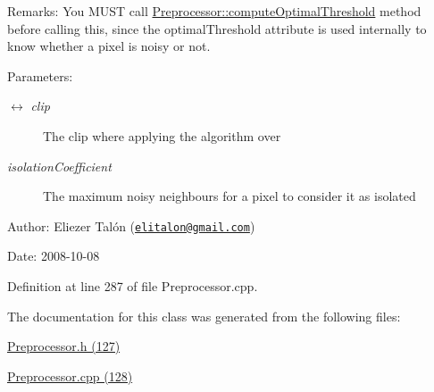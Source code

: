 \begin{Desc}
\item[Remarks:]You MUST call \hyperlink{class_preprocessor_0e146cafa6b8b31f4f4ed189a970db7a}{Preprocessor::computeOptimalThreshold} method before calling this, since the optimalThreshold attribute is used internally to know whether a pixel is noisy or not.\end{Desc}
\begin{Desc}
\item[Parameters:]
\begin{description}
\item[\mbox{$\leftrightarrow$} {\em clip}]The clip where applying the algorithm over \item[{\em isolationCoefficient}]The maximum noisy neighbours for a pixel to consider it as isolated\end{description}
\end{Desc}
\begin{Desc}
\item[Author:]Eliezer Talón (\href{mailto:elitalon@gmail.com}{\tt elitalon@gmail.com}) \end{Desc}
\begin{Desc}
\item[Date:]2008-10-08 \end{Desc}


Definition at line 287 of file Preprocessor.cpp.

The documentation for this class was generated from the following files:\begin{CompactItemize}
\item 
\hyperlink{_preprocessor_8h}{Preprocessor.h (127)}\item 
\hyperlink{_preprocessor_8cpp}{Preprocessor.cpp (128)}\end{CompactItemize}

